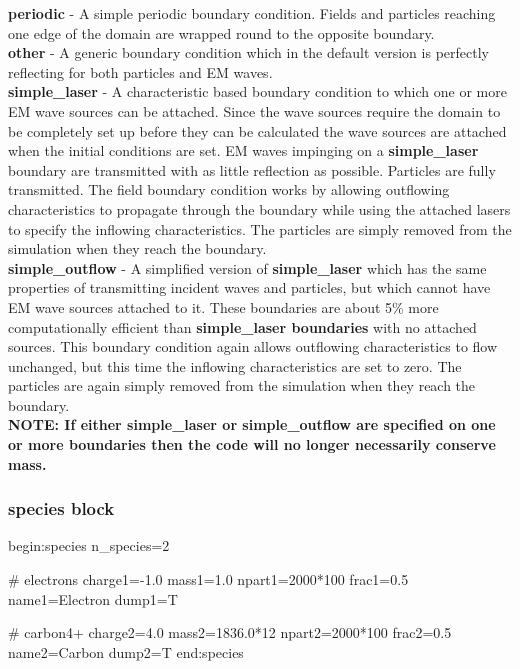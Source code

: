 \documentclass[12pt,a4paper]{article}
\newcommand{\emphtext}{\color{warwickdark} \fontfamily{phv}\selectfont\Large\bf}
\newcommand{\inlineemph}[1]{{\color{warwicklight} \bf{#1}}}
\newcommand{\EPOCH}{{\color{warwickdark}\fontfamily{phv}\selectfont{EPOCH}}}
\newenvironment{lboxverbatim}[1]{
\setlength{\FrameSep}{0pt}
\def\FrameCommand{\fboxsep=0pt \colorbox{shadecolor}}
\MakeFramed{\FrameRestore}
\vspace{-13.5pt}
\fvset{label=#1}
\boxverb
}{
\endboxverb
\vspace{-13.5pt}
\endMakeFramed
}
\begin{document}
{\emphtext periodic} - A simple periodic boundary condition. Fields and
particles reaching one edge of the domain are wrapped round to the opposite
boundary.\\

{\emphtext other} - A generic boundary condition which in the default {\EPOCH}
version is perfectly reflecting for both particles and EM waves.\\

{\emphtext simple\_laser} - A characteristic based boundary condition to which
one or more EM wave sources can be attached. Since the wave sources require the
domain to be completely set up before they can be calculated the wave sources
are attached when the initial conditions are set.  EM waves impinging on a
\inlineemph{simple\_laser} boundary are transmitted with as little reflection
as possible. Particles are fully transmitted. The field boundary condition
works by allowing outflowing characteristics to propagate through the boundary
while using the attached lasers to specify the inflowing characteristics. The
particles are simply removed from the simulation when they reach the
boundary.\\

{\emphtext simple\_outflow} - A simplified version of \inlineemph{simple\_laser}
which has the same properties of transmitting incident waves and
particles, but which cannot have EM wave sources attached to it. These
boundaries are about 5\% more computationally efficient than
\inlineemph{simple\_laser boundaries} with no attached sources. This boundary
condition again allows outflowing characteristics to flow unchanged, but this
time the inflowing characteristics are set to zero. The particles are again
simply removed from the simulation when they reach the boundary.\\

{\emphtext NOTE: If either simple\_laser or simple\_outflow are specified on
one or more boundaries then the code will no longer necessarily conserve mass.}

\subsubsection{\inlineemph{species} block}

\begin{lboxverbatim}{species block}
begin:species
   n_species=2

   # electrons
   charge1=-1.0
   mass1=1.0
   npart1=2000*100
   frac1=0.5
   name1=Electron
   dump1=T

   # carbon4+
   charge2=4.0
   mass2=1836.0*12
   npart2=2000*100
   frac2=0.5
   name2=Carbon
   dump2=T
end:species
\end{lboxverbatim}
\end{document}
